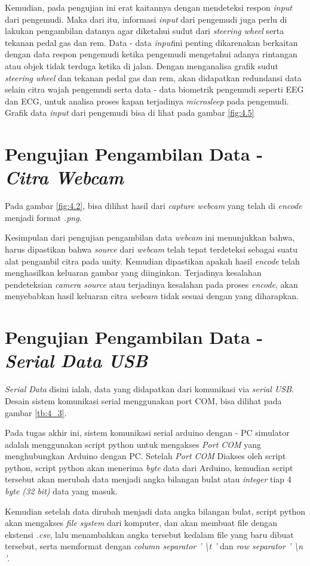 Kemudian, pada pengujian ini erat kaitannya dengan mendeteksi respon \textit{input} dari pengemudi. Maka dari itu, informasi \textit{input} dari pengemudi juga perlu di lakukan pengambilan datanya agar diketahui sudut dari \textit{steering wheel} serta tekanan pedal gas dan rem. Data - data \textit{input}ini penting dikarenakan berkaitan dengan data respon pengemudi ketika pengemudi mengetahui adanya rintangan atau objek tidak terduga ketika di jalan. Dengan menganalisa grafik sudut \textit{steering wheel} dan tekanan pedal gas dan rem, akan didapatkan redundansi data selain citra wajah pengemudi serta data - data biometrik pengemudi seperti EEG dan ECG, untuk analisa proses kapan terjadinya \textit{microsleep} pada pengemudi. Grafik data \textit{input} dari pengemudi bisa di lihat pada gambar \ref{fig:4.5}

\section{Pengujian Pengambilan Data - \textit{Citra Webcam}}
\vspace{1ex}

Pada gambar \ref{fig:4.2}, bisa dilihat hasil dari \textit{capture webcam} yang telah di \textit{encode} menjadi format \textit{.png}. 
\par Kesimpulan dari pengujian pengambilan data \textit{webcam} ini menunjukkan bahwa, harus dipastikan bahwa \textit{source} dari \textit{webcam} telah tepat terdeteksi sebagai suatu alat pengambil citra pada unity. Kemudian dipastikan apakah hasil \textit{encode} telah menghasilkan keluaran gambar yang diinginkan. Terjadinya kesalahan pendeteksian \textit{camera source} atau terjadinya kesalahan pada proses \textit{encode}, akan menyebabkan hasil keluaran citra \textit{webcam} tidak sesuai dengan yang diharapkan.

\section{Pengujian Pengambilan Data - \textit{Serial Data USB}}
\vspace{1ex}

\textit{Serial Data} disini ialah, data yang didapatkan dari komunikasi via \textit{serial USB}. Desain sistem komunikasi serial menggunakan port COM, bisa dilihat pada gambar \ref{tb:4_3}. 
\par Pada tugas akhir ini, sistem komunikasi serial arduino dengan - PC simulator adalah menggunakan script python untuk mengakses \textit{Port COM} yang menghubungkan Arduino dengan PC. Setelah \textit{Port COM} Diakses oleh script python, script python akan menerima \textit{byte} data dari Arduino, kemudian script tersebut akan merubah data menjadi angka bilangan bulat atau \textit{integer} tiap 4 \textit{byte (32 bit)} data yang masuk.
\par Kemudian setelah data dirubah menjadi data angka bilangan bulat, script python akan mengakses \textit{file system} dari komputer, dan akan membuat file dengan ekstensi \textit{.csv}, lalu menambahkan angka tersebut kedalam file yang baru dibuat tersebut, serta memformat dengan \textit{column separator ' \textbackslash{}t '} dan \textit{row separator ' \textbackslash{}n '}.

